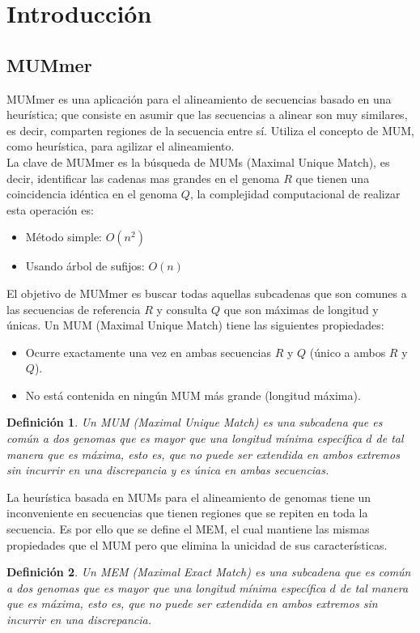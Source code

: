 \documentclass[11pt,a4paper,english]{article}
\newtheorem{mydef}{Definición}
\begin{document}
\section{Introducción}
\subsection{MUMmer}
\indent
MUMmer es una aplicación para el alineamiento de secuencias basado en una
heurística; que consiste en asumir que las secuencias a alinear son
muy similares, es decir, comparten regiones de la secuencia entre sí. Utiliza el
concepto de MUM, como heurística, para agilizar el alineamiento.\\
\indent
La clave de MUMmer es la búsqueda de MUMs (Maximal Unique Match), es decir, identificar las
cadenas mas grandes en el genoma $R$ que tienen una coincidencia idéntica en el
genoma $Q$, la complejidad computacional de realizar esta operación es:
\begin{itemize}
  \item Método simple: $O(n^2)$
  \item Usando árbol de sufijos: $O(n)$
\end{itemize}
\indent
El objetivo de MUMmer es buscar todas aquellas subcadenas que son comunes a las
secuencias de referencia $R$ y consulta $Q$ que son máximas de longitud y
únicas. Un MUM (Maximal Unique Match) tiene las siguientes propiedades:
\begin{itemize}
  \item Ocurre exactamente una vez en ambas secuencias $R$ y $Q$ (único a ambos
    $R$ y $Q$).  \item No está contenida en ningún MUM más grande (longitud
    máxima).
\end{itemize}
\begin{mydef}Un MUM (Maximal Unique Match) es una subcadena que es común a dos
  genomas que es mayor que una longitud mínima específica $d$ de tal manera
  que es máxima, esto es, que no puede ser extendida en ambos extremos sin
  incurrir en una discrepancia y es única en ambas secuencias. 
\end{mydef}
\indent
La heurística basada en MUMs para el alineamiento de genomas tiene un
inconveniente en secuencias que tienen regiones que se repiten en toda la
secuencia. Es por ello que se define el MEM, el cual mantiene las mismas
propiedades que el MUM pero que elimina la unicidad de sus características.\\
\begin{mydef}Un MEM (Maximal Exact Match) es una subcadena que es común a dos
  genomas que es mayor que una longitud mínima específica $d$ de tal manera
  que es máxima, esto es, que no puede ser extendida en ambos extremos sin
  incurrir en una discrepancia.
\end{mydef}
\end{document}
